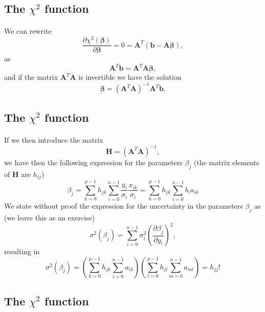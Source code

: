 \documentclass[%
oneside,                 %
final,                   %
10pt]{article}
\begin{document}
\subsection*{The $\chi^2$ function}

\paragraph{}

We can rewrite
\[
\frac{\partial \chi^2(\bm{\beta})}{\partial \bm{\beta}} = 0 = \bm{A}^T\left( \bm{b}-\bm{A}\bm{\beta}\right),  
\]
as
\[
\bm{A}^T\bm{b} = \bm{A}^T\bm{A}\bm{\beta},  
\]
and if the matrix $\bm{A}^T\bm{A}$ is invertible we have the solution
\[
\bm{\beta} =\left(\bm{A}^T\bm{A}\right)^{-1}\bm{A}^T\bm{b}.
\]



\subsection*{The $\chi^2$ function}

\paragraph{}

If we then introduce the matrix
\[
\bm{H} =  \left(\bm{A}^T\bm{A}\right)^{-1},
\]
we have then the following expression for the parameters $\beta_j$ (the matrix elements of $\bm{H}$ are $h_{ij}$)
\[
\beta_j = \sum_{k=0}^{p-1}h_{jk}\sum_{i=0}^{n-1}\frac{y_i}{\sigma_i}\frac{x_{ik}}{\sigma_i} = \sum_{k=0}^{p-1}h_{jk}\sum_{i=0}^{n-1}b_ia_{ik}
\]
We state without proof the expression for the uncertainty  in the parameters $\beta_j$ as (we leave this as an exercise)
\[
\sigma^2(\beta_j) = \sum_{i=0}^{n-1}\sigma_i^2\left( \frac{\partial \beta_j}{\partial y_i}\right)^2, 
\]
resulting in 
\[
\sigma^2(\beta_j) = \left(\sum_{k=0}^{p-1}h_{jk}\sum_{i=0}^{n-1}a_{ik}\right)\left(\sum_{l=0}^{p-1}h_{jl}\sum_{m=0}^{n-1}a_{ml}\right) = h_{jj}!
\]



\subsection*{The $\chi^2$ function}

\end{document}
